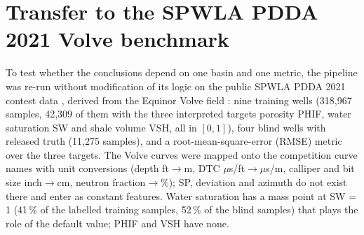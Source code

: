 \documentclass[preprint,12pt]{elsarticle}
\begin{document}
\section{Transfer to the SPWLA PDDA 2021 Volve benchmark}
\label{sec:transfer}

To test whether the conclusions depend on one basin and one metric, the pipeline was re-run without modification of its logic on the public SPWLA PDDA 2021 contest data \cite{pddasig2021,fu2024contest}, derived from the Equinor Volve field \cite{volve2018}: nine training wells (318,967 samples, 42,309 of them with the three interpreted targets porosity PHIF, water saturation SW and shale volume VSH, all in $[0,1]$), four blind wells with released truth (11,275 samples), and a root-mean-square-error (RMSE) metric over the three targets. The Volve curves were mapped onto the competition curve names with unit conversions (depth ft$\to$m, DTC $\mu$s/ft$\to\mu$s/m, calliper and bit size inch$\to$cm, neutron fraction$\to$\%); SP, deviation and azimuth do not exist there and enter as constant features. Water saturation has a mass point at SW = 1 (41\,\% of the labelled training samples, 52\,\% of the blind samples) that plays the role of the default value; PHIF and VSH have none.

\begin{table}[t]
\centering
\caption{Volve transfer experiment. Left: leave-well-out cross-validation over the nine training wells (labelled samples only). Right: the four blind wells with released truth. RMSE is the contest metric over the three targets; ``tol.'' is the tolerance accuracy of Section~\ref{sec:metric} applied to PHIF (8\,\%).}
\label{tab:volve}
\small
{}
\end{table}
\end{document}
